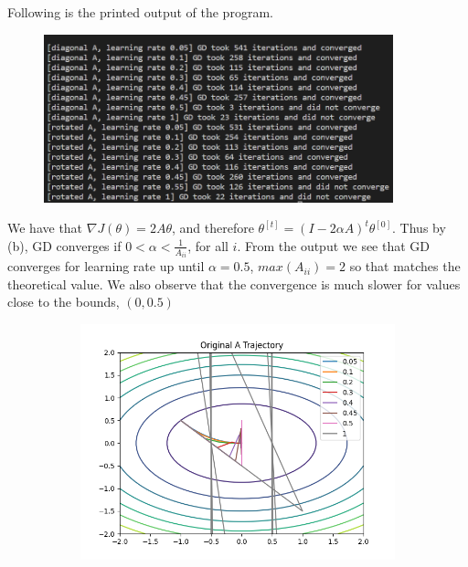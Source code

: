 \begin{answer}
\newpage
Following is the printed output of the program. 
\begin{figure}[H]
  \centering
  \includegraphics[width=0.9\textwidth]{gd_convergence/conv_rate_gd.PNG}
\end{figure}
We have that $\nabla J(\theta) = 2A\theta$, and therefore $\theta^{[t]} = (I-2\alpha A)^t\theta^{[0]}$. Thus by (b), GD converges if $0<\alpha<\frac{1}{A_{ii}}$, for all $i$.
From the output we see that GD converges for learning rate up until $\alpha = 0.5$, $max(A_{ii})=2$ so that matches the theoretical value. We also observe that the convergence is much slower for values close to the bounds, $(0, 0.5)$
\begin{figure}[H]
  \centering
  \begin{subfigure}[b]{0.49\textwidth}
    \includegraphics[width=\textwidth]{gd_convergence/trajectories.png}
  \end{subfigure}
  \begin{subfigure}[b]{0.49\textwidth}

\end{subfigure}
\end{figure}
\end{answer}
